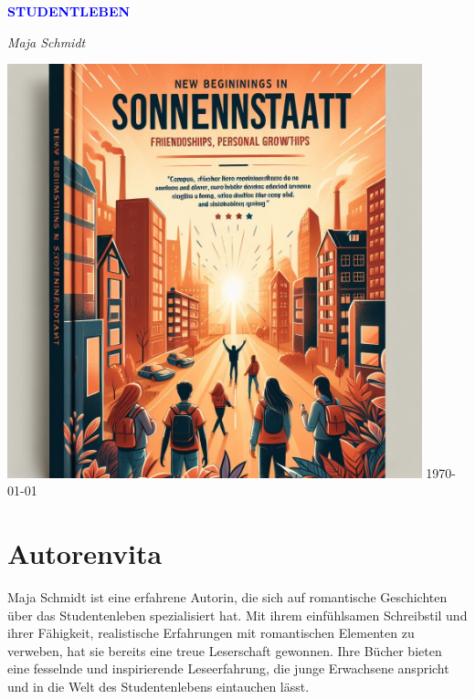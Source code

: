 \documentclass[12pt]{article} %
\begin{document}
\begin{titlepage}
    \centering
    \vspace*{3cm}
    {\Huge\bfseries\textcolor{blue}{\MakeUppercase{ Studentleben }}\par} %
    \vspace{0.5cm} %
    {\Large\textit{ Maja Schmidt }\par} %
    \vfill
    \includegraphics[width=0.9\textwidth]{ cover.jpg } %
    \vfill
    \today
\end{titlepage}

\section*{Autorenvita}
\vspace{4cm} %
Maja Schmidt ist eine erfahrene Autorin, die sich auf romantische Geschichten über das Studentenleben spezialisiert hat. Mit ihrem einfühlsamen Schreibstil und ihrer Fähigkeit, realistische Erfahrungen mit romantischen Elementen zu verweben, hat sie bereits eine treue Leserschaft gewonnen. Ihre Bücher bieten eine fesselnde und inspirierende Leseerfahrung, die junge Erwachsene anspricht und in die Welt des Studentenlebens eintauchen lässt.
\end{document}
